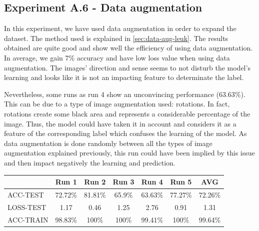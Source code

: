 \documentclass[11pt, openany]{report}
\theoremstyle{plain}
\theoremstyle{definition}
\theoremstyle{remark}
\begin{document}
\newpage
\subsection{Experiment A.6 - Data augmentation}

In this experiment, we have used data augmentation in order to expand the dataset. The method used is explained in \autoref{sec:data-aug-leuk}. The results obtained are quite good and show well the efficiency of using data augmentation. In average, we gain 7\% accuracy and have low loss value when using data augmentation. The images' direction and sense seems to not disturb the model's learning and looks like it is not an impacting feature to determinate the label. 

Nevertheless, some runs as run 4 show an unconvincing performance (63.63\%). This can be due to a type of image augmentation used: rotations. In fact, rotations create some black area and represents a considerable percentage of the image. Thus, the model could have taken it in account and considers it as a feature of the corresponding label which confuses the learning of the model. As data augmentation is done randomly between all the types of image augmentation explained previously, this run could have been implied by this issue and then impact negatively the learning and prediction.     

\begin{center}
\begin{tabular}{|l|c|c|c|c|c|c|}
  \hline
   & \textbf{Run 1} & \textbf{Run 2} & \textbf{Run 3} & \textbf{Run 4} & \textbf{Run 5} & \textbf{AVG}\\
  \hline
  ACC-TEST & 72.72\% & 81.81\% & 65.9\% & 63.63\% & 77.27\% & 72.26\% \\
  LOSS-TEST & 1.17 & 0.46 & 1.25 & 2.76  & 0.91 & 1.31 \\ 
  ACC-TRAIN & 98.83\% & 100\% & 100\% & 99.41\% & 100\% & 99.64\% \\ 
  \hline
\end{tabular}
\label{table:results-A6}
\end{center}
\end{document}
